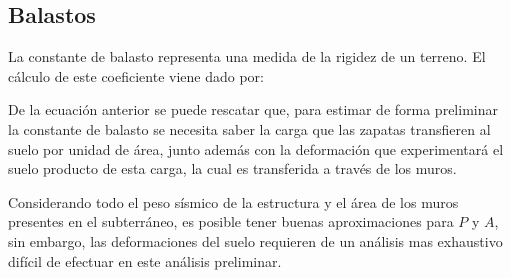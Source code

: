 \subsection{Balastos}
La constante de balasto representa una medida de la rigidez de un terreno. El cálculo de este coeficiente viene dado por:


De la ecuación anterior se puede rescatar que, para estimar de forma preliminar la constante de balasto se necesita saber la carga que las zapatas transfieren al suelo por unidad de área, junto además con la deformación que experimentará el suelo producto de esta carga, la cual es transferida a través de los muros.

Considerando todo el peso sísmico de la estructura y el área de los muros presentes en el subterráneo, es posible tener buenas aproximaciones para $P$ y $A$, sin embargo, las deformaciones del suelo requieren de un análisis mas exhaustivo difícil de efectuar en este análisis preliminar.

